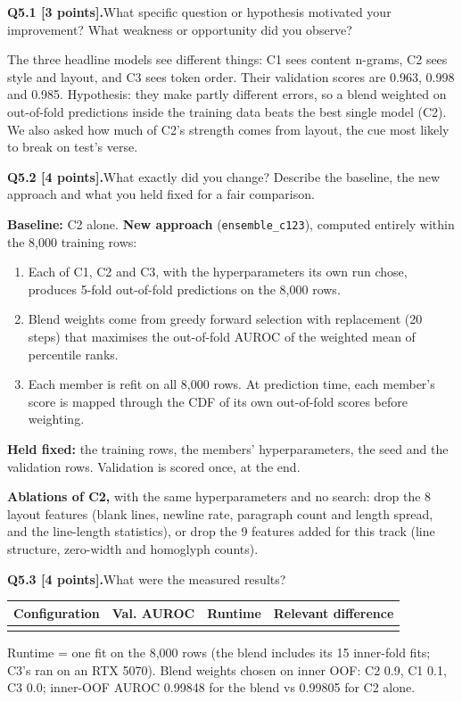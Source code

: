 \documentclass[11pt,letterpaper]{article}
\newcommand{\question}[2]{\needspace{4\baselineskip}\par\addvspace{0.45em}\noindent\textbf{#1}\quad #2\par\nobreak\vspace{0.1em}}
\newcommand{\smallnote}[1]{{\small\color{muted}#1}}
\begin{document}
\question{Q5.1 [3 points].}{What specific question or hypothesis motivated your improvement? What weakness or opportunity did you observe?}
The three headline models see different things: C1 sees content n-grams, C2 sees style and layout, and C3 sees token order. Their validation scores are 0.963, 0.998 and 0.985. Hypothesis: they make partly different errors, so a blend weighted on out-of-fold predictions inside the training data beats the best single model (C2). We also asked how much of C2's strength comes from layout, the cue most likely to break on test's verse.

\question{Q5.2 [4 points].}{What exactly did you change? Describe the baseline, the new approach and what you held fixed for a fair comparison.}
\textbf{Baseline:} C2 alone. \textbf{New approach} (\texttt{ensemble\_c123}), computed entirely within the 8,000 training rows:
\begin{enumerate}
\item Each of C1, C2 and C3, with the hyperparameters its own run chose, produces 5-fold out-of-fold predictions on the 8,000 rows.
\item Blend weights come from greedy forward selection with replacement (20 steps) that maximises the out-of-fold AUROC of the weighted mean of percentile ranks.
\item Each member is refit on all 8,000 rows. At prediction time, each member's score is mapped through the CDF of its own out-of-fold scores before weighting.
\end{enumerate}
\textbf{Held fixed:} the training rows, the members' hyperparameters, the seed and the validation rows. Validation is scored once, at the end.

\textbf{Ablations of C2,} with the same hyperparameters and no search: drop the 8 layout features (blank lines, newline rate, paragraph count and length spread, and the line-length statistics), or drop the 9 features added for this track (line structure, zero-width and homoglyph counts).

\question{Q5.3 [4 points].}{What were the measured results?}
{\small\begin{tabularx}{\linewidth}{@{}YrrY@{}}\toprule Configuration & Val. AUROC & Runtime & Relevant difference \\ \midrule
{}
\bottomrule\end{tabularx}}
\smallnote{Runtime = one fit on the 8,000 rows (the blend includes its 15 inner-fold fits; C3's ran on an RTX 5070). Blend weights chosen on inner OOF: C2 0.9, C1 0.1, C3 0.0; inner-OOF AUROC 0.99848 for the blend vs 0.99805 for C2 alone.}
\end{document}
